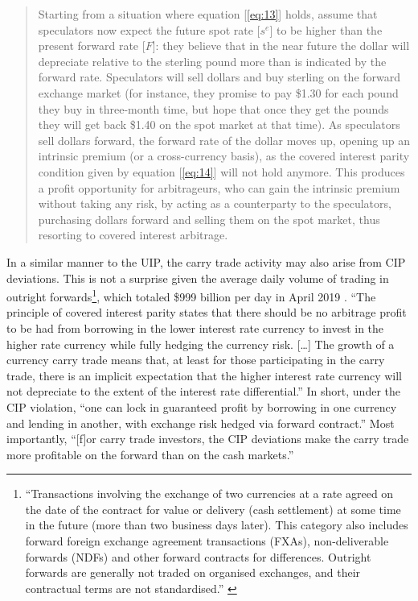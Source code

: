 \documentclass[a4paper, twoside]{templates/ociamthesis}
\begin{document}
\begin{quote}
Starting from a situation where equation {[}\eqref{eq:13}{]} holds, assume that speculators now expect the future spot rate {[}\(s^e\){]} to be higher than the present forward rate {[}\(F\){]}: they believe that in the near future the dollar will depreciate relative to the sterling pound more than is indicated by the forward rate. Speculators will sell dollars and buy sterling on the forward exchange market (for instance, they promise to pay \$1.30 for each pound they buy in three-month time, but hope that once they get the pounds they will get back \$1.40 on the spot market at that time). As speculators sell dollars forward, the forward rate of the dollar moves up, opening up an intrinsic premium (or a cross-currency basis), as the covered interest parity condition given by equation {[}\eqref{eq:14}{]} will not hold anymore. This produces a profit opportunity for arbitrageurs, who can gain the intrinsic premium without taking any risk, by acting as a counterparty to the speculators, purchasing dollars forward and selling them on the spot market, thus resorting to covered interest arbitrage. \autocite[ 20]{lavoie2021}
\end{quote}

In a similar manner to the UIP, the carry trade activity may also arise from CIP deviations. This is not a surprise given the average daily volume of trading in outright forwards\footnote{``Transactions involving the exchange of two currencies at a rate agreed on the date of the contract for value or delivery (cash settlement) at some time in the future (more than two business days later). This category also includes forward foreign exchange agreement transactions (FXAs), non-deliverable forwards (NDFs) and other forward contracts for differences. Outright forwards are generally not traded on organised exchanges, and their contractual terms are not standardised.'' \autocite[ 17]{bankforinternationalsettlements2019}}, which totaled \$999 billion per day in April 2019 \autocite[ 6]{bankforinternationalsettlements2019}. ``The principle of covered interest parity states that there should be no arbitrage profit to be had from borrowing in the lower interest rate currency to invest in the higher rate currency while fully hedging the currency risk. {[}\ldots{]} The growth of a currency carry trade means that, at least for those participating in the carry trade, there is an implicit expectation that the higher interest rate currency will not depreciate to the extent of the interest rate differential.'' \autocite[ 21]{lee2020} In short, under the CIP violation, ``one can lock in guaranteed profit by borrowing in one currency and lending in another, with exchange risk hedged via forward contract.'' \autocite[ 121]{bekaert2017} Most importantly, ``{[}f{]}or carry trade investors, the CIP deviations make the carry trade more profitable on the forward than on the cash markets.'' \autocite[ 950]{du2018}
\end{document}
